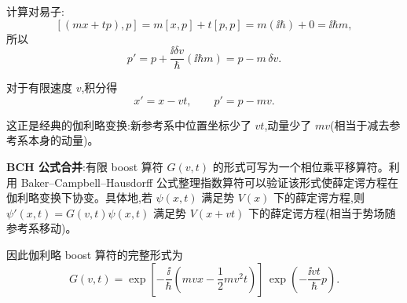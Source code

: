 \begin{question}
\begin{solution}
	计算对易子:
	\[
	[(mx+tp),p] = m[x,p] + t[p,p] = m(\ii\hbar) + 0 = \ii\hbar m,
	\]
	所以
	\[
	p' = p + \frac{\ii\delta v}{\hbar}(\ii\hbar m) = p - m\,\delta v.
	\]

	对于有限速度 $v$,积分得
	\[
	\boxed{x' = x - vt},\qquad
	\boxed{p' = p - mv}.
	\]

	这正是经典的伽利略变换:新参考系中位置坐标少了 $vt$,动量少了 $mv$(相当于减去参考系本身的动量)。

	\textbf{BCH 公式合并}:有限 boost 算符 $G(v,t)$ 的形式可写为一个相位乘平移算符。利用 Baker--Campbell--Hausdorff 公式整理指数算符可以验证该形式使薛定谔方程在伽利略变换下协变。具体地,若 $\psi(x,t)$ 满足势 $V(x)$ 下的薛定谔方程,则 $\psi'(x,t)=G(v,t)\psi(x,t)$ 满足势 $V(x+vt)$ 下的薛定谔方程(相当于势场随参考系移动)。

	因此伽利略 boost 算符的完整形式为
	\[
	\boxed{G(v,t)=\exp\!\left[-\frac{\ii}{\hbar}\left(mvx-\frac12 mv^2t\right)\right]\,\exp\!\left(-\frac{\ii v t}{\hbar}p\right)}.
	\]
	\end{solution}
\end{question}

